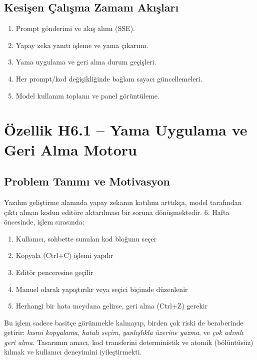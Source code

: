 \documentclass[12pt,a4paper]{article}
\begin{document}
\subsection{Kesişen Çalışma Zamanı Akışları}
\begin{enumerate}[leftmargin=*]
  \item Prompt gönderimi ve akış alımı (SSE).
  \item Yapay zeka yanıtı işleme ve yama çıkarımı.
  \item Yama uygulama ve geri alma durum geçişleri.
  \item Her prompt/kod değişikliğinde bağlam sayacı güncellemeleri.
  \item Model kullanım toplamı ve panel görüntüleme.
\end{enumerate}



\section{Özellik H6.1 -- Yama Uygulama ve Geri Alma Motoru}

\subsection{Problem Tanımı ve Motivasyon}

Yazılım geliştirme alanında yapay zekanın katılımı arttıkça, model tarafından çıktı alınan kodun editöre aktarılması bir soruna dönüşmektedir. 6. Hafta öncesinde, işlem sırasında:
\begin{enumerate}[leftmargin=*]
  \item Kullanıcı, sohbette sunulan kod bloğunu seçer
  \item Kopyala (Ctrl+C) işlemi yapılır
  \item Editör penceresine geçilir
  \item Manuel olarak yapıştırılır veya seçici biçimde düzenlenir
  \item Herhangi bir hata meydana gelirse, geri alma (Ctrl+Z) gerekir
\end{enumerate}

Bu işlem sadece basitçe görünmekle kalmayıp, birden çok riski de beraberinde getirir: \textit{kısmi kopyalama}, \textit{hatalı seçim}, \textit{yanlışlıkla üzerine yazma}, ve \textit{çok adımlı geri alma}. Tasarımın amacı, kod transferini deterministik ve atomik (bölüntüsüz) kılmak ve kullanıcı deneyimini iyileştirmekti.
\end{document}
